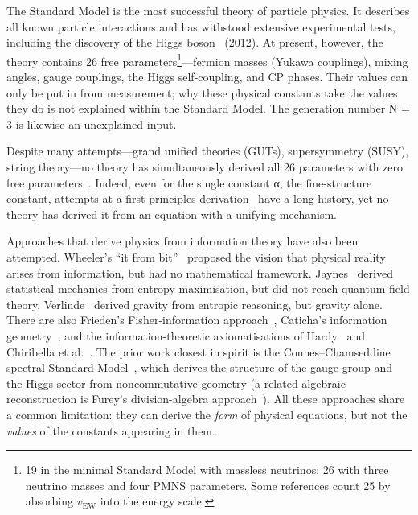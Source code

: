 \documentclass[12pt,a4paper]{article}
\begin{document}
The Standard Model is the most successful theory of particle physics. It describes all known particle interactions and has withstood extensive experimental tests, including the discovery of the Higgs boson~\cite{atlas,cms} (2012). At present, however, the theory contains 26 free parameters\footnote{19 in the minimal Standard Model with massless neutrinos; 26 with three neutrino masses and four PMNS parameters. Some references count 25 by absorbing $v_\mathrm{EW}$ into the energy scale.}---fermion masses (Yukawa couplings), mixing angles, gauge couplings, the Higgs self-coupling, and CP phases. Their values can only be put in from measurement; why these physical constants take the values they do is not explained within the Standard Model. The generation number N = 3 is likewise an unexplained input.

Despite many attempts---grand unified theories (GUTs), supersymmetry (SUSY), string theory---no theory has simultaneously derived all 26 parameters with zero free parameters~\cite{xing}. Indeed, even for the single constant α, the fine-structure constant, attempts at a first-principles derivation~\cite{eddington,wyler,jentschura} have a long history, yet no theory has derived it from an equation with a unifying mechanism.

Approaches that derive physics from information theory have also been attempted. Wheeler's ``it from bit''~\cite{wheeler} proposed the vision that physical reality arises from information, but had no mathematical framework. Jaynes~\cite{jaynes} derived statistical mechanics from entropy maximisation, but did not reach quantum field theory. Verlinde~\cite{verlinde} derived gravity from entropic reasoning, but gravity alone. There are also Frieden's Fisher-information approach~\cite{frieden}, Caticha's information geometry~\cite{caticha}, and the information-theoretic axiomatisations of Hardy~\cite{hardy} and Chiribella et al.~\cite{chiribella}. The prior work closest in spirit is the Connes–Chamseddine spectral Standard Model~\cite{connes96,chamconnes96,ccm07}, which derives the structure of the gauge group and the Higgs sector from noncommutative geometry (a related algebraic reconstruction is Furey's division-algebra approach~\cite{furey}). All these approaches share a common limitation: they can derive the \emph{form} of physical equations, but not the \emph{values} of the constants appearing in them.
\end{document}

